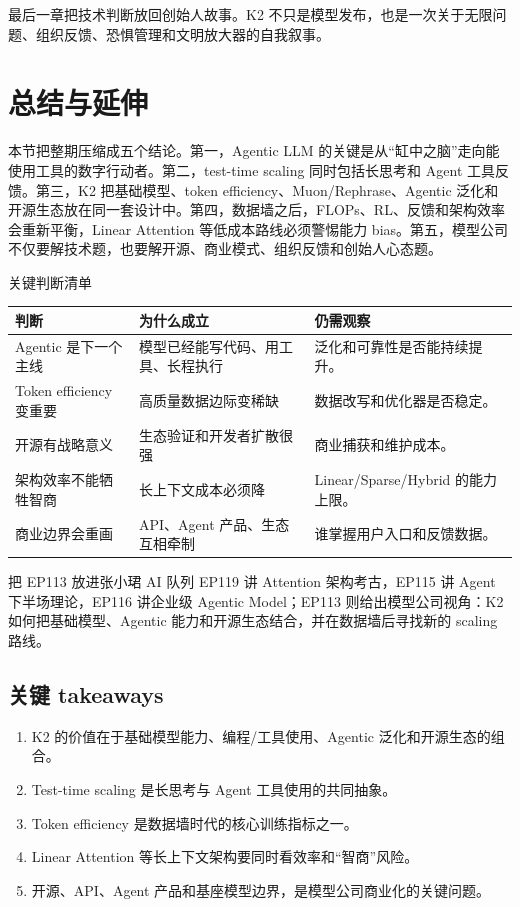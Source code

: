 \documentclass[a4paper]{article}
\begin{document}
最后一章把技术判断放回创始人故事。K2 不只是模型发布，也是一次关于无限问题、组织反馈、恐惧管理和文明放大器的自我叙事。

\section{总结与延伸}

本节把整期压缩成五个结论。第一，Agentic LLM 的关键是从“缸中之脑”走向能使用工具的数字行动者。第二，test-time scaling 同时包括长思考和 Agent 工具反馈。第三，K2 把基础模型、token efficiency、Muon/Rephrase、Agentic 泛化和开源生态放在同一套设计中。第四，数据墙之后，FLOPs、RL、反馈和架构效率会重新平衡，Linear Attention 等低成本路线必须警惕能力 bias。第五，模型公司不仅要解技术题，也要解开源、商业模式、组织反馈和创始人心态题。

\begin{knowledgebox}{关键判断清单}
\begin{tabularx}{\textwidth}{p{}p{}X}
\toprule
判断 & 为什么成立 & 仍需观察 \\
\midrule
Agentic 是下一个主线 & 模型已经能写代码、用工具、长程执行 & 泛化和可靠性是否能持续提升。 \\
Token efficiency 变重要 & 高质量数据边际变稀缺 & 数据改写和优化器是否稳定。 \\
开源有战略意义 & 生态验证和开发者扩散很强 & 商业捕获和维护成本。 \\
架构效率不能牺牲智商 & 长上下文成本必须降 & Linear/Sparse/Hybrid 的能力上限。 \\
商业边界会重画 & API、Agent 产品、生态互相牵制 & 谁掌握用户入口和反馈数据。 \\
\bottomrule
\end{tabularx}
\end{knowledgebox}

\begin{importantbox}{把 EP113 放进张小珺 AI 队列}
EP119 讲 Attention 架构考古，EP115 讲 Agent 下半场理论，EP116 讲企业级 Agentic Model；EP113 则给出模型公司视角：K2 如何把基础模型、Agentic 能力和开源生态结合，并在数据墙后寻找新的 scaling 路线。
\end{importantbox}

\subsection{关键 takeaways}

\begin{enumerate}
\item K2 的价值在于基础模型能力、编程/工具使用、Agentic 泛化和开源生态的组合。
\item Test-time scaling 是长思考与 Agent 工具使用的共同抽象。
\item Token efficiency 是数据墙时代的核心训练指标之一。
\item Linear Attention 等长上下文架构要同时看效率和“智商”风险。
\item 开源、API、Agent 产品和基座模型边界，是模型公司商业化的关键问题。
\end{enumerate}
\end{document}
